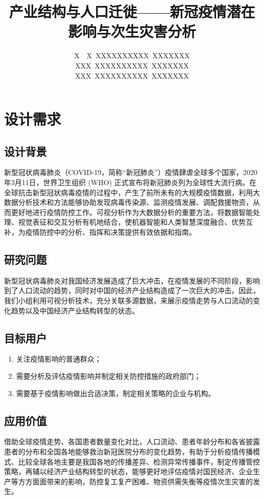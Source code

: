 \documentclass{ctexart}
\title{产业结构与人口迁徙——新冠疫情潜在影响与次生灾害分析}
\author{X\ \ X\ XXXXXXXXXX\ XXXXXXX \\ XXX\ XXXXXXXXXX\ XXXXXXX \\ XXX\ XXXXXXXXXX\ XXXXXXX}
\begin{document}
\begin{titlepage}
    \maketitle
\end{titlepage}
\tableofcontents
\newpage
\section{设计需求}

\subsection{设计背景}
新型冠状病毒肺炎（COVID-19，简称“新冠肺炎”）疫情肆虐全球多个国家，2020年3月11日，世界卫生组织 (WHO) 正式宣布将新冠肺炎列为全球性大流行病。在全球抗击新型冠状病毒疫情的过程中，产生了前所未有的大规模疫情数据，利用大数据分析技术和方法能够协助发现病毒传染源、监测疫情发展、调配救援物资，从而更好地进行疫情防控工作。可视分析作为大数据分析的重要方法，将数据智能处理、视觉表征和交互分析有机地结合，使机器智能和人类智慧深度融合、优势互补，为疫情防控中的分析、指挥和决策提供有效依据和指南。
\subsection{研究问题}
新型冠状病毒肺炎对我国经济发展造成了巨大冲击，在疫情发展的不同阶段，影响到了人口流动的趋势，同时对中国的经济产业结构造成了一次巨大的冲击。因此，我们小组利用可视分析技术，充分关联多源数据，来展示疫情走势与人口流动的变化趋势以及中国经济产业结构转型的状态。
\subsection{目标用户}
\begin{enumerate}
    \item 关注疫情影响的普通群众；
    \item 需要分析及评估疫情影响并制定相关防控措施的政府部门；
    \item 需要基于疫情影响做出合适决策，制定相关策略的企业与机构。
\end{enumerate}
\subsection{应用价值}
借助全球疫情走势、各国患者数量变化对比，人口流动、患者年龄分布和各省披露患者的分布和全国各地能够救治新冠医院分布的变化趋势，有助于分析疫情传播模式、比较全球各地主要是我国各地的传播差异、检测异常传播事件，制定传播管控策略，再辅以经济产业结构转型的状态，能够更好地评估疫情对国民经济、企业生产等方方面面带来的影响，防控复工复产困难、物资供需失衡等疫情次生灾害的发生。
\end{document}
